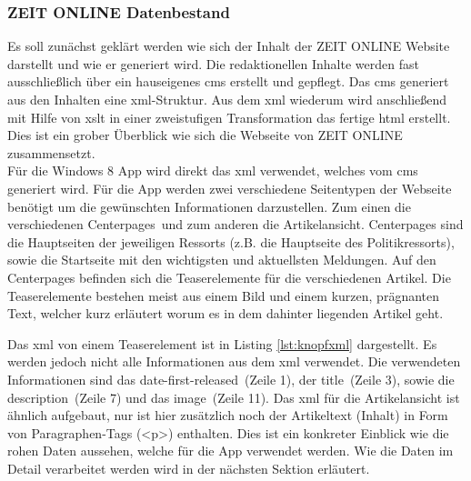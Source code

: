 \documentclass[12pt,a4paper]{scrartcl}
\begin{document}
\subsubsection{ZEIT ONLINE Datenbestand}
\label{subsubsec:zondatenbestand}
Es soll zunächst geklärt werden wie sich der Inhalt der ZEIT ONLINE Website darstellt und wie er generiert wird. Die redaktionellen Inhalte werden fast ausschließlich über ein hauseigenes \ac{cms} erstellt und gepflegt. Das \ac{cms} generiert aus den Inhalten eine \ac{xml}-Struktur. Aus dem \ac{xml} wiederum wird anschließend mit Hilfe von \ac{xslt} in einer zweistufigen Transformation das fertige \ac{html} erstellt. Dies ist ein grober Überblick wie sich die Webseite von ZEIT ONLINE zusammensetzt.\\
Für die Windows 8 App wird direkt das \ac{xml} verwendet, welches vom \ac{cms} generiert wird. Für die App werden zwei verschiedene Seitentypen der Webseite benötigt um die gewünschten Informationen darzustellen. Zum einen die verschiedenen \glqq Centerpages\grqq\ und zum anderen die Artikelansicht. Centerpages sind die Hauptseiten der jeweiligen Ressorts (z.B. die Hauptseite des Politikressorts), sowie die Startseite mit den wichtigsten und aktuellsten Meldungen. Auf den Centerpages befinden sich die Teaserelemente für die verschiedenen Artikel. Die Teaserelemente bestehen meist aus einem Bild und einem kurzen, prägnanten Text, welcher kurz erläutert worum es in dem dahinter liegenden Artikel geht.\\

\begin{minipage}{\linewidth}

\end{minipage}

Das \ac{xml} von einem Teaserelement ist in Listing \ref{lst:knopfxml} dargestellt. Es werden jedoch nicht alle Informationen aus dem \ac{xml} verwendet. Die verwendeten Informationen sind das \glqq date-first-released\grqq\ (Zeile 1), der \glqq title\grqq\ (Zeile 3), sowie die \glqq description\grqq\ (Zeile 7) und das \glqq image\grqq\ (Zeile 11). Das \ac{xml} für die Artikelansicht ist ähnlich aufgebaut, nur ist hier zusätzlich noch der Artikeltext (Inhalt) in Form von Paragraphen-Tags (<p>) enthalten. Dies ist ein konkreter Einblick wie die rohen Daten aussehen, welche für die App verwendet werden. Wie die Daten im Detail verarbeitet werden wird in der nächsten Sektion erläutert.
\end{document}
